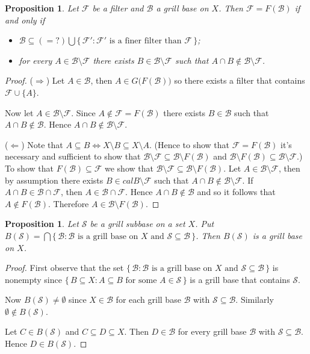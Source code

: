 \documentclass[12pt]{article}
\theoremstyle{plain}
\newtheorem{prop}[thm]{Proposition}
\theoremstyle{definition}
\newcommand{\calB}{\mathcal{B}}
\newcommand{\calF}{\mathcal{F}}
\newcommand{\calS}{\mathcal{S}}
\begin{document}
\begin{prop}
  Let $\calF$ be a filter and $\calB$ a grill base on $X$.
  Then $\calF = F(\calB)$ if and only if 
  \begin{itemize}
    \item[(1)] $\calB \subseteq (=?) \bigcup\{\, \calF' : \calF'
      \mbox{ is a finer filter than } \calF \,\}$;

    \item[(2)] for every $A \in \calB \setminus \calF$ there exists $B
      \in \calB \setminus \calF$ such that $A \cap B \not \in \calB
      \setminus \calF$. 
  \end{itemize}
\end{prop}
\begin{proof}
  ($\Rightarrow$)
  Let $A \in \calB$, then $A \in G\bigl(F(\calB)\bigr)$ so there
  exists a filter that contains $\calF \cup \{A\}$.

  Now let $A \in \calB\setminus\calF$.
  Since $A \not\in \calF = F(\calB)$ there exists $B \in
  \calB$ such that $A \cap B \not \in \calB$.
  Hence $A \cap B \not\in \calB \setminus \calF$.   

  ($\Leftarrow$)
  Note that $A \subseteq B \iff X \setminus B \subseteq X \setminus
  A$. 
  (Hence to show that $\calF = F(\calB)$ it's necessary and sufficient 
  to show that $\calB \setminus \calF  \subseteq \calB \setminus
  F(\calB)$ and $\calB \setminus F(\calB) \subseteq \calB \setminus
  \calF$.)
  To show that $F(\calB) \subseteq \calF$ we show that $\calB \setminus
  \calF \subseteq \calB \setminus F(\calB)$.
  Let $A \in \calB \setminus \calF$, then by assumption there exists
  $B \in calB \setminus \calF$ such that $A \cap B \not\in \calB
  \setminus \calF$. 
  If $A \cap B \in \calB \cap \calF$, then $A \in \calB \cap \calF$. 
  Hence $A \cap B \not\in \calB$ and so it follows that $A \not\in
  F(\calB)$.
  Therefore $A \in \calB \setminus F(\calB)$. 
\end{proof}

\begin{prop}
  Let $\calS$ be a grill subbase on a set $X$.
  Put $B(\calS) = \bigcap \{\, \calB : \mbox{$\calB$ is a grill base
    on $X$ and $\calS \subseteq \calB$} \,\}$.
  Then $B(\calS)$ is a grill base on $X$.
\end{prop}
\begin{proof}
  First observe that the set $\{\, \calB : \mbox{$\calB$ is a grill base
    on $X$ and $\calS \subseteq \calB$} \,\}$ is nonempty since $\{\,
  B \subseteq X : \mbox{$A \subseteq B$ for some $A \in \calS$} \,\}$ is
  a grill base that contains $\calS$. 

  Now $B(\calS) \ne \emptyset$ since $X \in \calB$ for each grill base
  $\calB$ with $\calS \subseteq \calB$. 
  Similarly $\emptyset \not \in B(\calS)$.
  
  Let $C \in B(\calS)$ and $C \subseteq D \subseteq X$. 
  Then $D \in \calB$ for every grill base $\calB$ with $\calS
  \subseteq \calB$.
  Hence $D \in B(\calS)$.
\end{proof}
\end{document}
